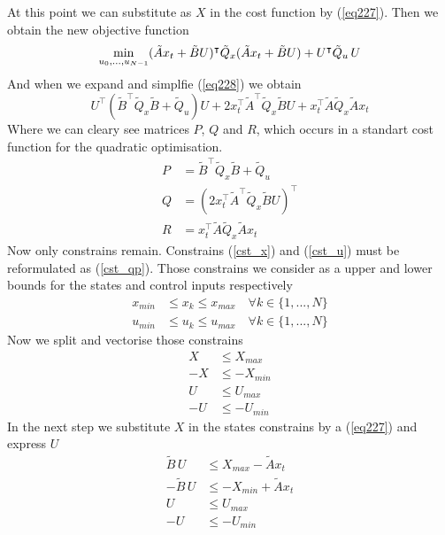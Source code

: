 At this point we can substitute as $X$ in the cost function by (\ref{eq227}). Then we obtain the new objective function
\begin{equation}\label{eq228}
	\min_{u_0,...,u_{N-1}} (\tilde{A}x_t + \tilde{B}U)^\intercal\tilde{Q}_x(\tilde{A}x_t + \tilde{B}U) + U^\intercal\tilde{Q}_u\,U\\
\end{equation}
And when we expand and simplfie (\ref{eq228}) we obtain
\begin{equation}
	U^\intercal(\tilde{B}^\intercal\tilde{Q}_x\tilde{B} + \tilde{Q}_u)U + 2x_t^\intercal\tilde{A}^\intercal\tilde{Q}_x\tilde{B}U + x_t^\intercal\tilde{A}\tilde{Q}_x\tilde{A}x_t
\end{equation}
Where we can cleary see matrices $P$, $Q$ and $R$, which occurs in a standart cost function for the quadratic optimisation.
\begin{subequations}
	\begin{align}
		P &= \tilde{B}^\intercal\tilde{Q}_x\tilde{B} + \tilde{Q}_u\\
		Q &= (2x_t^\intercal\tilde{A}^\intercal\tilde{Q}_x\tilde{B}U)^\intercal\\
		R &= x_t^\intercal\tilde{A}\tilde{Q}_x\tilde{A}x_t
	\end{align}
\end{subequations}
Now only constrains remain. Constrains (\ref{cst_x}) and (\ref{cst_u}) must be reformulated as (\ref{cst_qp}). Those constrains we consider as a upper and lower bounds for the states and control inputs respectively
\begin{subequations}
	\begin{align}
		x_{min} &\leq x_k \leq x_{max} \quad \forall k \in \{1,...,N\}\\
		u_{min} &\leq u_k \leq u_{max} \quad \forall k \in \{1,...,N\}
	\end{align}
\end{subequations}
Now we split and vectorise those constrains
\begin{subequations}
\begin{align}
	X &\leq X_{max}\\
	-X &\leq -X_{min}\\
	U &\leq U_{max}\\
	-U &\leq -U_{min}
\end{align}
\end{subequations}
In the next step we substitute $X$ in the states constrains by a (\ref{eq227}) and express $U$
\begin{subequations}
	\begin{align}
	\tilde{B}\,U &\leq X_{max} - \tilde{A}x_t\\
	-\tilde{B}\,U &\leq -X_{min} + \tilde{A}x_t\\
	U &\leq U_{max}\\
	-U &\leq -U_{min}
	\end{align}
\end{subequations}
